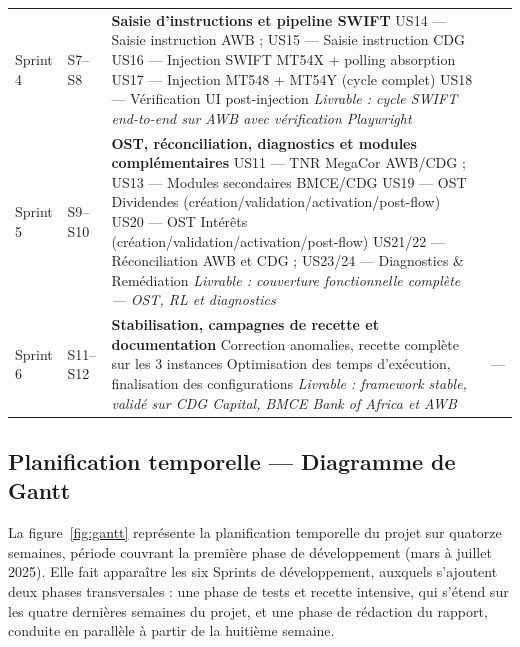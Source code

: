 \documentclass[12pt, a4paper]{report}
\begin{document}
\begin{longtable}{@{}p{1.5cm}p{1.5cm}p{\dimexpr\linewidth-1.5cm-1.5cm-1.5cm-6\tabcolsep\relax}>{\centering\arraybackslash}p{1.5cm}@{}}
Sprint 4
  & S7–S8
  & \textbf{Saisie d'instructions et pipeline SWIFT}\newline
    {\footnotesize
    US14 — Saisie instruction AWB ; US15 — Saisie instruction CDG\newline
    US16 — Injection SWIFT MT54X + polling absorption\newline
    US17 — Injection MT548 + MT54Y (cycle complet)\newline
    US18 — Vérification UI post-injection\newline
    \textit{Livrable : cycle SWIFT end-to-end sur AWB avec vérification Playwright}}
  & 42 \tabularnewline[4pt]

Sprint 5
  & S9–S10
  & \textbf{OST, réconciliation, diagnostics et modules complémentaires}\newline
    {\footnotesize
    US11 — TNR MegaCor AWB/CDG ; US13 — Modules secondaires BMCE/CDG\newline
    US19 — OST Dividendes (création/validation/activation/post-flow)\newline
    US20 — OST Intérêts (création/validation/activation/post-flow)\newline
    US21/22 — Réconciliation AWB et CDG ; US23/24 — Diagnostics \& Remédiation\newline
    \textit{Livrable : couverture fonctionnelle complète — OST, RL et diagnostics}}
  & 50 \tabularnewline[4pt]

Sprint 6
  & S11–S12
  & \textbf{Stabilisation, campagnes de recette et documentation}\newline
    {\footnotesize
    Correction anomalies, recette complète sur les 3 instances\newline
    Optimisation des temps d'exécution, finalisation des configurations\newline
    \textit{Livrable : framework stable, validé sur CDG Capital, BMCE Bank of Africa et AWB}}
  & — \tabularnewline
\end{longtable}
\endgroup

\subsection{Planification temporelle — Diagramme de Gantt}

La figure~\ref{fig:gantt} représente la planification temporelle du projet sur quatorze semaines, période couvrant la première phase de développement (mars à juillet 2025). Elle fait apparaître les six Sprints de développement, auxquels s'ajoutent deux phases transversales : une phase de tests et recette intensive, qui s'étend sur les quatre dernières semaines du projet, et une phase de rédaction du rapport, conduite en parallèle à partir de la huitième semaine.
\end{document}
